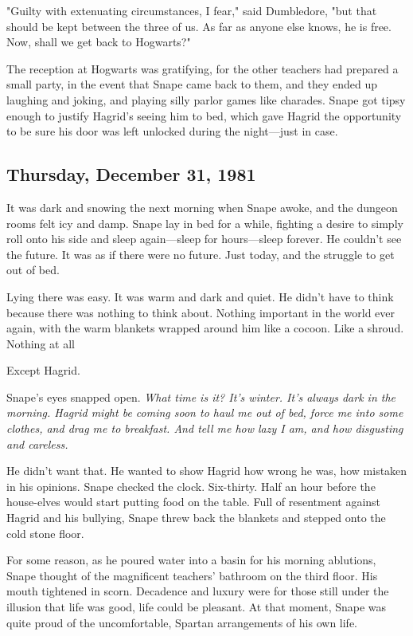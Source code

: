 "Guilty with extenuating circumstances, I fear," said Dumbledore, "but that should be kept between the three of us. As far as anyone else knows, he is free. Now, shall we get back to Hogwarts?"

The reception at Hogwarts was gratifying, for the other teachers had prepared a small party, in the event that Snape came back to them, and they ended up laughing and joking, and playing silly parlor games like charades. Snape got tipsy enough to justify Hagrid's seeing him to bed, which gave Hagrid the opportunity to be sure his door was left unlocked during the night—just in case.

\subsection{Thursday, December 31, 1981}

It was dark and snowing the next morning when Snape awoke, and the dungeon rooms felt icy and damp. Snape lay in bed for a while, fighting a desire to simply roll onto his side and sleep again—sleep for hours—sleep forever. He couldn't see the future. It was as if there were no future. Just today, and the struggle to get out of bed.

Lying there was easy. It was warm and dark and quiet. He didn't have to think because there was nothing to think about. Nothing important in the world ever again, with the warm blankets wrapped around him like a cocoon. Like a shroud. Nothing at all{\el}

Except Hagrid.

Snape's eyes snapped open. \emph{What time is it? It's winter. It's always dark in the morning. Hagrid might be coming soon to haul me out of bed, force me into some clothes, and drag me to breakfast. And tell me how lazy I am, and how disgusting and careless.}

He didn't want that. He wanted to show Hagrid how wrong he was, how mistaken in his opinions. Snape checked the clock. Six-thirty. Half an hour before the house-elves would start putting food on the table. Full of resentment against Hagrid and his bullying, Snape threw back the blankets and stepped onto the cold stone floor.

For some reason, as he poured water into a basin for his morning ablutions, Snape thought of the magnificent teachers' bathroom on the third floor. His mouth tightened in scorn. Decadence and luxury were for those still under the illusion that life was good, life could be pleasant. At that moment, Snape was quite proud of the uncomfortable, Spartan arrangements of his own life.

